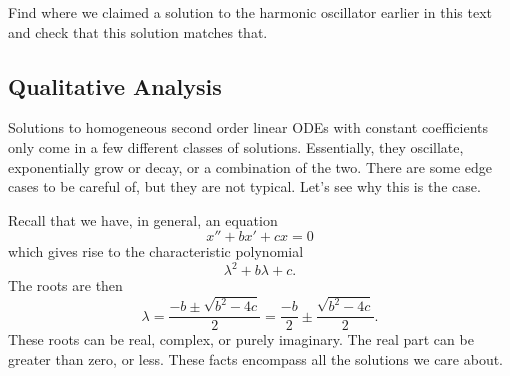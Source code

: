         \newpage
        
        \begin{exercise}
        Find where we claimed a solution to the harmonic oscillator earlier in this text and check that this solution matches that.
        \end{exercise}
        
        \subsection{Qualitative Analysis}
        
        Solutions to homogeneous second order linear ODEs with constant coefficients only come in a few different classes of solutions. Essentially, they oscillate, exponentially grow or decay, or a combination of the two.  There are some edge cases to be careful of, but they are not typical.  Let's see why this is the case.
        
        Recall that we have, in general, an equation 
        \[
        x''+bx'+cx=0
        \]
        which gives rise to the characteristic polynomial
        \[
        \lambda^2+b\lambda + c.
        \]
        The roots are then
        \[
        \lambda = \frac{-b\pm \sqrt{b^2-4c}}{2}= \frac{-b}{2}\pm \frac{\sqrt{b^2-4c}}{2}.
        \]
        These roots can be real, complex, or purely imaginary. The real part can be greater than zero, or less.  These facts encompass all the solutions we care about.
        
